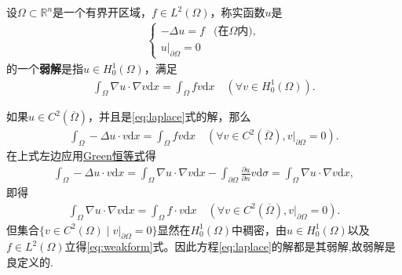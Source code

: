 \documentclass[../../main.tex]{subfiles}%
\begin{document}
\begin{definition}\label{definition:hjojwfeiowjojfiojwiowej}
设$\Omega\subset\mathbb{R}^n$是一个有界开区域，$f\in L^2(\Omega)$，称实函数$u$是
\begin{align}
\begin{cases}
-\Delta u=f & \text{(在$\Omega$内)}, \\
u|_{\partial\Omega}=0
\end{cases}
\label{eq:laplace}
\end{align}
的一个\textbf{弱解}是指$u\in H_0^1(\Omega)$，满足
\begin{align}
\int_\Omega \nabla u\cdot\nabla v\mathrm{d}x=\int_\Omega fv\mathrm{d}x\quad (\forall v\in H_0^1(\Omega)).
\label{eq:weakform}
\end{align}
\end{definition}
\begin{remark}
如果$u\in C^2(\overline{\Omega})$，并且是\eqref{eq:laplace}式的解，那么
\begin{align*}
\int_\Omega -\Delta u\cdot v\mathrm{d}x=\int_\Omega fv\mathrm{d}x\quad (\forall v\in C^2(\overline{\Omega}),v|_{\partial\Omega}=0).
\end{align*}
在上式左边应用\hyperref[Basis of Analytics-theorem:Green恒等式]{Green恒等式}得
\begin{align*}
\int_\Omega -\Delta u\cdot v\mathrm{d}x=\int_\Omega \nabla u\cdot\nabla v\mathrm{d}x-\int_{\partial\Omega}\frac{\partial u}{\partial n}v\mathrm{d}\sigma
=\int_\Omega \nabla u\cdot\nabla v\mathrm{d}x,
\end{align*}
即得
\begin{align*}
\int_\Omega \nabla u\cdot\nabla v\mathrm{d}x=\int_\Omega f\cdot v\mathrm{d}x\quad (\forall v\in C^2(\overline{\Omega}),v|_{\partial\Omega}=0).
\end{align*}
但集合$\{v\in C^2(\Omega)\mid v|_{\partial\Omega}=0\}$显然在$H_0^1(\Omega)$中稠密，由$u\in H_0^1(\Omega)$以及$f\in L^2(\Omega)$立得\eqref{eq:weakform}式。因此方程\eqref{eq:laplace}的解都是其弱解,故弱解是良定义的.
\end{remark}
\end{document}
